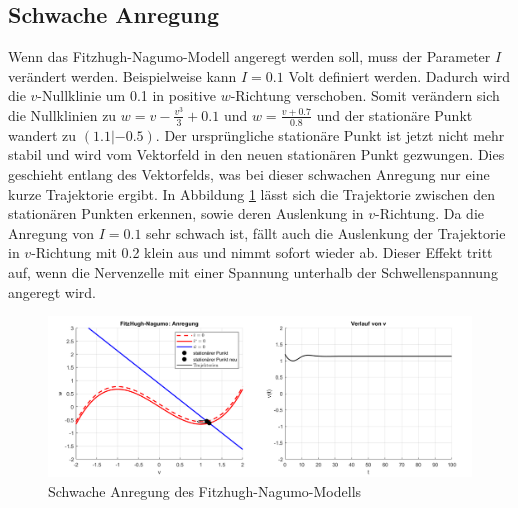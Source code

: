 \begin{refsection}
\subsection{Schwache Anregung}
Wenn das Fitzhugh-Nagumo-Modell angeregt werden soll, muss der Parameter $I$ verändert werden.
Beispielweise kann $I = 0.1$ Volt definiert werden.
Dadurch wird die $v$-Nullklinie um 0.1 in positive $w$-Richtung verschoben.
Somit verändern sich die Nullklinien zu \( w = v - \frac{v^3}{3} + 0.1\)
und \(w = \frac{v + 0.7}{0.8}\) und der stationäre Punkt wandert zu $(1.1 |-0.5)$.
Der ursprüngliche stationäre Punkt ist jetzt nicht mehr stabil und wird vom Vektorfeld in den neuen stationären Punkt
gezwungen.
Dies geschieht entlang des Vektorfelds, was bei dieser schwachen Anregung nur eine kurze Trajektorie ergibt.
In Abbildung \ref{fig:schwacheAnregung} lässt sich die Trajektorie zwischen den stationären Punkten erkennen, sowie
deren Auslenkung in $v$-Richtung.
Da die Anregung von $I = 0.1$ sehr schwach ist, fällt auch die Auslenkung der Trajektorie in $v$-Richtung mit 0.2 klein aus und
nimmt sofort wieder ab. 
Dieser Effekt tritt auf, wenn die Nervenzelle mit einer Spannung unterhalb der Schwellenspannung angeregt wird.
\begin{figure}[h]
    \centering
    \includegraphics[width=\textwidth]{papers/nerven/Bilder/schwacheAnregung.png}
    \caption{Schwache Anregung des Fitzhugh-Nagumo-Modells}
    \label{fig:schwacheAnregung}
\end{figure}

\end{refsection}
